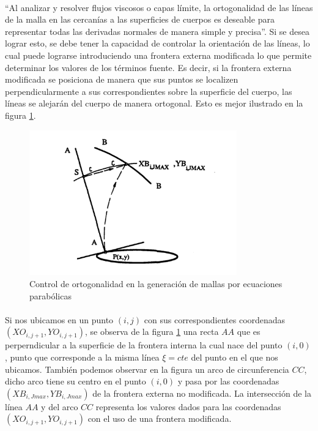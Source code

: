 \documentclass[letterpaper, openright, 12pt]{book}
\begin{document}
    \paragraph*{}
    ``Al analizar y resolver flujos viscosos o capas límite, la
    ortogonalidad de las líneas de la malla en las cercanías a las
    superficies de cuerpos es deseable para representar todas las derivadas
    normales de manera simple y  precisa''\cite{siladicParabolic}. Si se
    desea lograr esto, se debe tener la capacidad de controlar la
    orientación de las líneas, lo cual puede lograrse introduciendo una
    frontera externa modificada lo que permite determinar los valores de los
    términos fuente. Es decir, si la frontera externa modificada se
    posiciona de manera que sus puntos se localizen perpendicularmente a sus
    correspondientes sobre la superficie del cuerpo, las líneas se alejarán
    del cuerpo de manera ortogonal. Esto es mejor ilustrado en la figura
    \ref{fig:parabolic_modified}.
    \begin{figure}[htbp!]
        \centering
        \includegraphics[keepaspectratio, width=0.8\textwidth]{./img/parabolic_modified_boundary.png}
        \caption[Control de ortogonalidad]{Control de ortogonalidad en la
        generación de mallas por ecuaciones parabólicas \cite{siladicParabolic}}
        \label{fig:parabolic_modified}
    \end{figure}

    \paragraph*{}
    Si nos ubicamos en un punto $(i, j)$ con sus correspondientes
    coordenadas $(XO_{i, j + 1}, YO_{i, j+1})$, se observa de la figura
    \ref{fig:parabolic_modified} una recta $AA$ que es perperndicular a la
    superficie de la frontera interna la cual nace del punto $(i, 0)$, punto
    que corresponde a la misma línea $\xi = cte$ del punto en el que nos
    ubicamos. También podemos observar en la figura un arco de
    circunferencia $CC$, dicho arco tiene su centro en el punto $(i, 0)$ y
    pasa por las coordenadas $(XB_{i, Jmax}, YB_{i, Jmax})$ de la frontera
    externa no modificada. La intersección de la línea $AA$ y del arco $CC$
    representa los valores dados para las coordenadas $(XO_{i, j + 1},
    YO_{i, j+1})$ con el uso de una frontera modificada.
\end{document}
